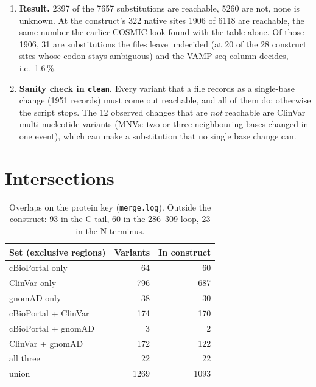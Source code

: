 \documentclass[11pt,a4paper]{article}
\newcommand{\file}[1]{\texttt{#1}}
\begin{document}
\begin{enumerate}
  \file{PTEN\_variant\_data.tsv} (on astaroth) has a column \texttt{snv} that
  says, for each substitution, whether one base change of PTEN's cDNA makes
  it; it gives a value for 7639 substitutions. The two sources both give a
  value for 7532, and they agree on 7531. The one disagreement is M1V: ATG
  $\to$ GTG makes valine with one base, but the table marks it not reachable,
  presumably because a change of the start codon is not a missense change. It
  is outside the construct. Where the files leave a substitution undecided,
  the table's value is used.
\item \textbf{Result.} 2397 of the 7657 substitutions are reachable, 5260 are
  not, none is unknown. At the construct's 322 native sites 1906 of 6118 are
  reachable, the same number the earlier COSMIC look found with the table
  alone. Of those 1906, 31 are substitutions the files leave undecided (at 20
  of the 28 construct sites whose codon stays ambiguous) and the VAMP-seq
  column decides, i.e.\ 1.6\,\%.
\item \textbf{Sanity check in \file{clean}.} Every variant that a file
  records as a single-base change (1951 records) must come out reachable, and
  all of them do; otherwise the script stops. The 12 observed changes that are
  \emph{not} reachable are ClinVar multi-nucleotide variants (MNVs: two or
  three neighbouring bases changed in one event), which can make a
  substitution that no single base change can.
\end{enumerate}

\section{Intersections}

\begin{table}[H]
\centering\small
\begin{tabular}{@{}lrr@{}}
\toprule
Set (exclusive regions) & Variants & In construct \\
\midrule
cBioPortal only & 64 & 60 \\
ClinVar only & 796 & 687 \\
gnomAD only & 38 & 30 \\
cBioPortal + ClinVar & 174 & 170 \\
cBioPortal + gnomAD & 3 & 2 \\
ClinVar + gnomAD & 172 & 122 \\
all three & 22 & 22 \\
\midrule
union & 1269 & 1093 \\
\bottomrule
\end{tabular}
\caption{Overlaps on the protein key (\file{merge.log}). Outside the
construct: 93 in the C-tail, 60 in the 286--309 loop, 23 in the N-terminus.}
\label{tab:overlap}
\end{table}
\end{document}
